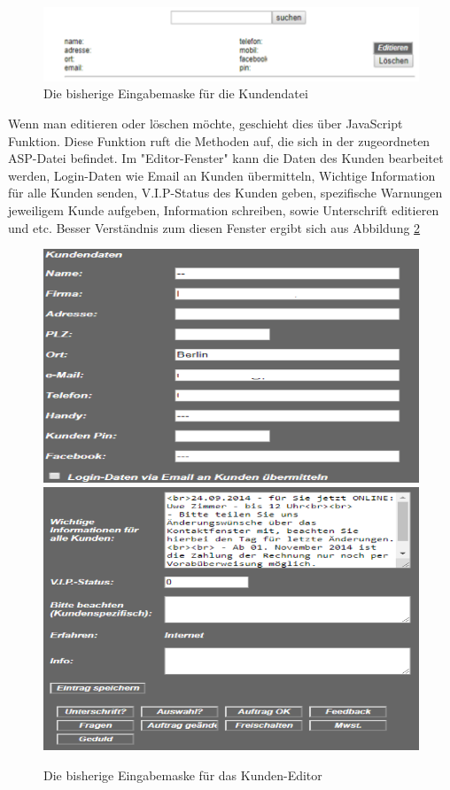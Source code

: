\begin{figure}[h]
	\centering
	\includegraphics[width=0.7\linewidth]{Graphics/kundenDatei.png}
	\caption[Kundeansicht]{Die bisherige Eingabemaske für die Kundendatei}
	\label{fig:KundenDatei}
\end{figure}

Wenn man editieren oder löschen möchte, geschieht dies über JavaScript Funktion. Diese Funktion ruft die Methoden auf, die sich in der zugeordneten ASP-Datei befindet. Im "Editor-Fenster" kann die Daten des Kunden bearbeitet werden, Login-Daten wie Email an Kunden übermitteln, Wichtige Information für alle Kunden senden, V.I.P-Status des Kunden geben, spezifische Warnungen jeweiligem Kunde aufgeben, Information schreiben, sowie Unterschrift editieren und etc. Besser Verständnis zum diesen Fenster ergibt sich aus Abbildung \ref{fig:KundenEditor}


\pagebreak

\begin{figure}[h]
	\centering
	\includegraphics[width=0.7\linewidth]{Graphics/kundeEditieren.png}
	\includegraphics[width=0.7\linewidth]{Graphics/kundeEditieren1.png}
	\caption[Kundeansicht]{Die bisherige Eingabemaske für das Kunden-Editor}
	\label{fig:KundenEditor}
\end{figure}


